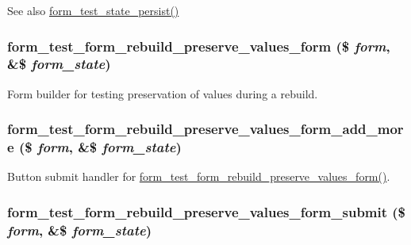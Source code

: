 \begin{DoxySeeAlso}{See also}
\hyperlink{form__test_8module_a5d7a4c512e68401d8dd332c78b078867}{form\_\-test\_\-state\_\-persist()} 
\end{DoxySeeAlso}
\hypertarget{form__test_8module_a8110b3241d2e10fb9a9b650c4f2884c3}{
\subsubsection[{form\_\-test\_\-form\_\-rebuild\_\-preserve\_\-values\_\-form}]{\setlength{\rightskip}{0pt plus 5cm}form\_\-test\_\-form\_\-rebuild\_\-preserve\_\-values\_\-form (\$ {\em form}, \/  \&\$ {\em form\_\-state})}}
\label{form__test_8module_a8110b3241d2e10fb9a9b650c4f2884c3}
Form builder for testing preservation of values during a rebuild. \hypertarget{form__test_8module_a13c278168fe8985572df1248e0c03e51}{
\subsubsection[{form\_\-test\_\-form\_\-rebuild\_\-preserve\_\-values\_\-form\_\-add\_\-more}]{\setlength{\rightskip}{0pt plus 5cm}form\_\-test\_\-form\_\-rebuild\_\-preserve\_\-values\_\-form\_\-add\_\-more (\$ {\em form}, \/  \&\$ {\em form\_\-state})}}
\label{form__test_8module_a13c278168fe8985572df1248e0c03e51}
Button submit handler for \hyperlink{form__test_8module_a8110b3241d2e10fb9a9b650c4f2884c3}{form\_\-test\_\-form\_\-rebuild\_\-preserve\_\-values\_\-form()}. \hypertarget{form__test_8module_a033fef384d76554268bbf52c2098b7ed}{
\subsubsection[{form\_\-test\_\-form\_\-rebuild\_\-preserve\_\-values\_\-form\_\-submit}]{\setlength{\rightskip}{0pt plus 5cm}form\_\-test\_\-form\_\-rebuild\_\-preserve\_\-values\_\-form\_\-submit (\$ {\em form}, \/  \&\$ {\em form\_\-state})}}
